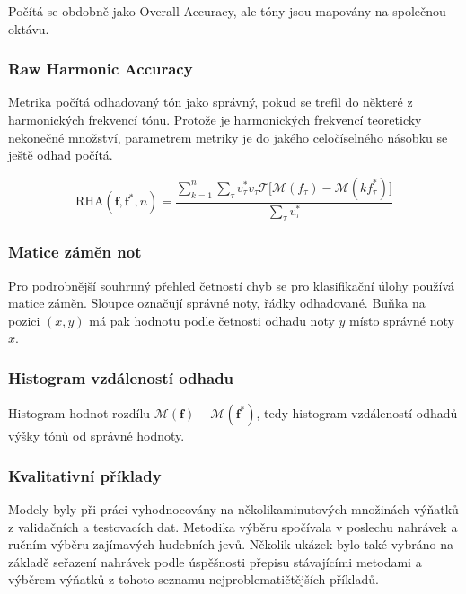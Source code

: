 Počítá se obdobně jako Overall Accuracy, ale tóny jsou mapovány na společnou oktávu.

\subsubsection{Raw Harmonic Accuracy}

Metrika počítá odhadovaný tón jako správný, pokud se trefil do některé z harmonických frekvencí tónu. Protože je harmonických frekvencí teoreticky nekonečné množství, parametrem metriky je do jakého celočíselného násobku se ještě odhad počítá.

    $$\mathrm{RHA}(\mathbf{f}, \mathbf{f^*}, n) = \frac{\sum_{k=1}^n \sum_\tau{v^*_\tau v_\tau \mathcal{T}[\mathcal{M}(f_\tau) - \mathcal{M}(k f^*_\tau)} ] }{\sum_\tau{v^*_\tau}}$$

\subsubsection{Matice záměn not}

Pro podrobnější souhrnný přehled četností chyb se pro klasifikační úlohy používá matice záměn. Sloupce označují správné noty, řádky odhadované. Buňka na pozici $(x,y)$ má pak hodnotu podle četnosti odhadu noty $y$ místo správné noty $x$.

\subsubsection{Histogram vzdáleností odhadu}

Histogram hodnot rozdílu $\mathcal{M}(\mathbf{f}) - \mathcal{M}(\mathbf{f^*})$, tedy histogram vzdáleností odhadů výšky tónů od správné hodnoty.


\subsubsection{Kvalitativní příklady}

Modely byly při práci vyhodnocovány na několikaminutových množinách výňatků z validačních a testovacích dat. Metodika výběru spočívala v poslechu nahrávek a ručním výběru zajímavých hudebních jevů. Několik ukázek bylo také vybráno na základě seřazení nahrávek podle úspěšnosti přepisu stávajícími metodami a výběrem výňatků z tohoto seznamu nejproblematičtějších příkladů.




